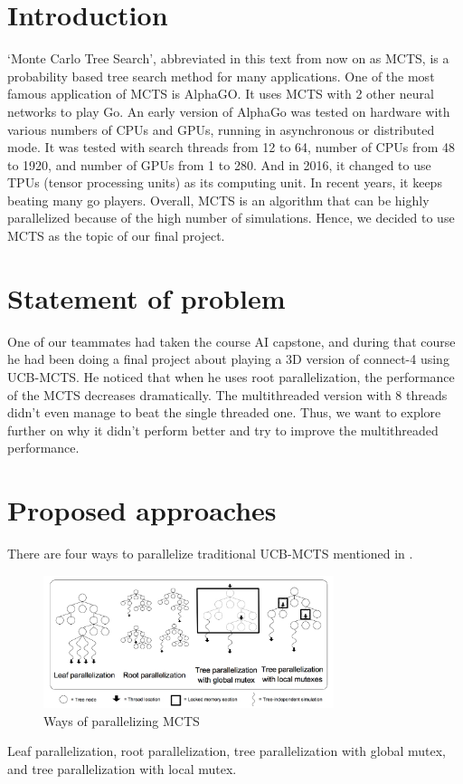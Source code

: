 \documentclass[sigconf]{acmart}
\begin{document}
\maketitle

\section{Introduction}
`Monte Carlo Tree Search', abbreviated in this text from now on as MCTS, is a probability based tree search method for many applications. 
One of the most famous application of MCTS is AlphaGO. It uses MCTS with 2 other neural networks to play Go. An early version of AlphaGo was tested on hardware with various numbers of CPUs and GPUs, running in asynchronous or distributed mode. It was tested with search threads from 12 to 64, number of CPUs from 48 to 1920, and number of GPUs from 1 to 280. And in 2016, it changed to use TPUs (tensor processing units) as its computing unit. In recent years, it keeps beating many go players. Overall, MCTS is an algorithm that can be highly parallelized because of the high number of simulations. Hence, we decided to use MCTS as the topic of our final project.

\section{Statement of problem}
One of our teammates had taken the course AI capstone, and during that course he had been doing a final project about playing a 3D version of connect-4 using UCB-MCTS. He noticed that when he uses root parallelization, the performance of the MCTS decreases dramatically. The multithreaded version with 8 threads didn’t even manage to beat the single threaded one. Thus, we want to explore further on why it didn’t perform better and try to improve the multithreaded performance. 

\section{Proposed approaches}
There are four ways to parallelize traditional UCB-MCTS mentioned in \cite{guillaumeMCTS}.

\begin{figure}[H]
  \includegraphics[width=8.5cm]{MCTS-parallel.png}
  \caption{Ways of parallelizing MCTS}
\label{fig:mcts_parallel}
\end{figure}
Leaf parallelization, root parallelization, tree parallelization with global mutex, and tree parallelization with local mutex. 
\end{document}
